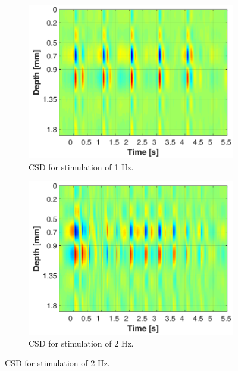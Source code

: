\documentclass{pracalicmgr}
\begin{document}
	\begin{figure}[H]
	\begin{subfigure}{.5\textwidth}
		\centering
		\includegraphics[width=1.\linewidth]{csd_1Hz_5s.png}
		\caption{CSD for stimulation of 1 Hz.}
		\label{rys:csd_1Hz}
	\end{subfigure}%
	\begin{subfigure}{.5\textwidth}
		\centering
		\includegraphics[width=1.\linewidth]{csd_2Hz_5s.png}
		\caption{CSD for stimulation of 2 Hz.}
		\label{rys:csd_2Hz}
	\end{subfigure}
	

\end{figure}
\end{document}
